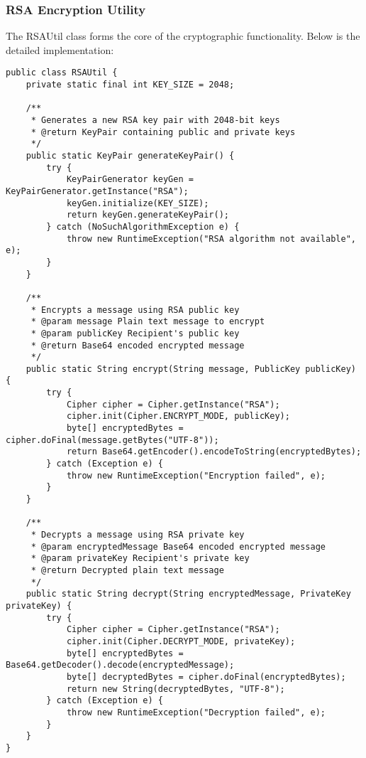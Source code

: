 \documentclass[12pt,a4paper]{article}
\begin{document}
\subsubsection{RSA Encryption Utility}

The RSAUtil class forms the core of the cryptographic functionality. Below is the detailed implementation:

\begin{lstlisting}[caption=RSA Key Generation Implementation]
public class RSAUtil {
    private static final int KEY_SIZE = 2048;

    /**
     * Generates a new RSA key pair with 2048-bit keys
     * @return KeyPair containing public and private keys
     */
    public static KeyPair generateKeyPair() {
        try {
            KeyPairGenerator keyGen = KeyPairGenerator.getInstance("RSA");
            keyGen.initialize(KEY_SIZE);
            return keyGen.generateKeyPair();
        } catch (NoSuchAlgorithmException e) {
            throw new RuntimeException("RSA algorithm not available", e);
        }
    }

    /**
     * Encrypts a message using RSA public key
     * @param message Plain text message to encrypt
     * @param publicKey Recipient's public key
     * @return Base64 encoded encrypted message
     */
    public static String encrypt(String message, PublicKey publicKey) {
        try {
            Cipher cipher = Cipher.getInstance("RSA");
            cipher.init(Cipher.ENCRYPT_MODE, publicKey);
            byte[] encryptedBytes = cipher.doFinal(message.getBytes("UTF-8"));
            return Base64.getEncoder().encodeToString(encryptedBytes);
        } catch (Exception e) {
            throw new RuntimeException("Encryption failed", e);
        }
    }

    /**
     * Decrypts a message using RSA private key
     * @param encryptedMessage Base64 encoded encrypted message
     * @param privateKey Recipient's private key
     * @return Decrypted plain text message
     */
    public static String decrypt(String encryptedMessage, PrivateKey privateKey) {
        try {
            Cipher cipher = Cipher.getInstance("RSA");
            cipher.init(Cipher.DECRYPT_MODE, privateKey);
            byte[] encryptedBytes = Base64.getDecoder().decode(encryptedMessage);
            byte[] decryptedBytes = cipher.doFinal(encryptedBytes);
            return new String(decryptedBytes, "UTF-8");
        } catch (Exception e) {
            throw new RuntimeException("Decryption failed", e);
        }
    }
}
\end{lstlisting}
\end{document}
